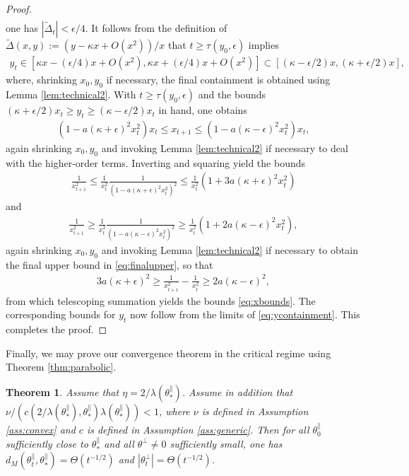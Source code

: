 \documentclass{article}
\newcommand{\tpa}{\theta^{\parallel}}
\newcommand{\tpe}{\theta^{\perp}}
\theoremstyle{plain}
\newtheorem{theorem}{Theorem}[section]
\theoremstyle{definition}
\theoremstyle{remark}
\begin{document}
\begin{proof}
\begin{align}
    \end{align}
    one has $|\widetilde{\Delta}_t|<\epsilon/4$. It follows from the definition of $\widetilde{\Delta}(x,y):=(y-\kappa x+O(x^2))/x$ that $t\geq \tau(y_0,\epsilon)$ implies
    \begin{align}
        y_t\in[\kappa x-(\epsilon/4)x + O(x^2),\kappa x+(\epsilon/4)x + O(x^2)]\subset [(\kappa-\epsilon/2)x,(\kappa+\epsilon/2)x],\label{eq:ycontainment}
    \end{align}
    where, shrinking $x_0,y_0$ if necessary, the final containment is obtained using Lemma \ref{lem:technical2}. With $t\geq \tau(y_0,\epsilon)$ and the bounds $(\kappa+\epsilon/2)x_t\geq y_t\geq (\kappa-\epsilon/2)x_t$ in hand, one obtains
    \begin{align}
        (1-a(\kappa+\epsilon)^2x_t^2)x_t\leq x_{t+1}\leq(1-a(\kappa-\epsilon)^2x_t^2)x_t,
    \end{align}
    again shrinking $x_0,y_0$ and invoking Lemma \ref{lem:technical2} if necessary to deal with the higher-order terms. Inverting and squaring yield the bounds
    \begin{align}
        \frac{1}{x_{t+1}^2}\leq \frac{1}{x_t^2}\frac{1}{(1-a(\kappa+\epsilon)^2x_t^2)^2}\leq\frac{1}{x_t^2}(1+3a(\kappa+\epsilon)^2x_t^2)\label{eq:finalupper}
    \end{align}
    and
    \begin{align}
        \frac{1}{x_{t+1}^2}\geq \frac{1}{x_t^2}\frac{1}{(1-a(\kappa-\epsilon)^2x_t^2)^2}\geq \frac{1}{x_t^2}(1+2a(\kappa-\epsilon)^2x_t^2),
    \end{align}
    again shrinking $x_0,y_0$ and invoking Lemma \ref{lem:technical2} if necessary to obtain the final upper bound in \eqref{eq:finalupper}, so that
    \begin{align}
        3a(\kappa+\epsilon)^2\geq \frac{1}{x_{t+1}^2}-\frac{1}{x_t^2}\geq 2a(\kappa-\epsilon)^2,
    \end{align}
    from which telescoping summation yields the bounds \eqref{eq:xbounds}. The corresponding bounds for $y_t$ now follow from the limits of \eqref{eq:ycontainment}. This completes the proof.
\end{proof}

Finally, we may prove our convergence theorem in the critical regime using Theorem \ref{thm:parabolic}.

\begin{theorem}\label{thm:critical}
    Assume that $\eta = 2/\lambda(\tpa_*)$. Assume in addition that $\nu/(c(2/\lambda(\tpa_*),\tpa_*)\lambda(\tpa_*))<1$, where $\nu$ is defined in Assumption \ref{ass:convex} and $c$ is defined in Assumption \ref{ass:generic}. Then for all $\tpa_0$ sufficiently close to $\tpa_*$ and all $\tpe\neq0$ sufficiently small, one has $d_M(\tpa_t,\tpa_*) = \Theta(t^{-1/2})$ and $|\tpe_t| = \Theta(t^{-1/2})$.
\end{theorem}
\end{document}
